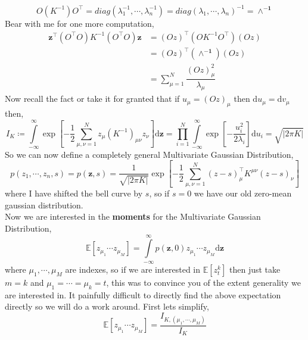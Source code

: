 \documentclass{scrartcl} %
\numberwithin{equation}{subsection}  %
\begin{document}
\begin{equation}
	O(K^{-1})O^\top = diag(\lambda_1^{-1},\cdots,\lambda_n^{-1}) =diag(\lambda_1,\cdots,\lambda_n)^{-1} = 
	\boldsymbol{\land^{-1}}
\end{equation}
Bear with me for one more computation,
\begin{align}
	\textbf{z}^\top(O^\top O) K^{-1}(O^\top O)\textbf{z} &=
         (Oz)^\top(OK^{-1}O^\top)(Oz)\\
							     &= (Oz)^\top (\boldsymbol{\land^{-1}})(Oz)\\
			&= \sum\limits_{\mu = 1}^N \dfrac{(Oz)_{\mu}^2}{\lambda_{\mu}}
\end{align}
Now recall the fact or take it for granted that if $u_{\mu} = (Oz)_{\mu}$ then $\mathrm{d}u_{\mu} = 
\mathrm{d}v_{\mu}$ then,
\begin{equation}
	I_K \coloneqq \int\limits_{-\infty}^{\infty}\exp\left[-\frac{1}{2}\sum\limits_{\mu,\nu = 1}^N z_{\mu} 
	(K^{-1})_{\mu \nu}z_{\nu}\right]\mathrm{d}\textbf{z} =
	\prod\limits_{i=1}^N\int\limits_{-\infty}^{\infty}\exp\left[-\frac{u_i^2}{2\lambda_i}\right]
	\mathrm{d}u_i = \sqrt{|2\pi K|}
\end{equation}
\newpage
So we can now define a completely general Multivariate Gaussian Distribution,
\begin{equation}
	p(z_1,\cdots, z_n, s) = p(\textbf{z},s) = \dfrac{1}{\sqrt{|2\pi K|}}
	\exp\left[-\frac{1}{2}\sum\limits_{\mu, \nu = 1}^N(z-s)_{\mu}^\top K^{\mu \nu}(z - s)_{\nu}\right]
\end{equation}
where I have shifted the bell curve by $s$, so if $s=0$ we have our old zero-mean gaussian distribution.\\
Now we are interested in the \textbf{moments} for the Multivariate Gaussian Distribution,
\begin{equation}
	\mathbb{E}[z_{\mu_1}\cdots z_{\mu_M}] = \int\limits_{-\infty}^{\infty}
	p(\textbf{z},0)z_{\mu_1}\cdots z_{\mu_M} \mathrm{d}\textbf{z}
\end{equation}
where $\mu_1,\cdots,\mu_M$ are indexes, so if we are interested in $\mathbb{E}[z_t^k]$ then just take $m = k$ and
$\mu_1 = \cdots = \mu_k = t$, this was to convince you of the extent generality we are interested in.
It painfully difficult to directly find the above expectation directly 
so we will do a work around. First lets simplify,
\begin{equation}
\mathbb{E}[z_{\mu_1}\cdots z_{\mu_M}] = \dfrac{I_{K,\left(\mu_1,\cdots,\mu_M\right)}}{I_K}
\end{equation}
\end{document}
